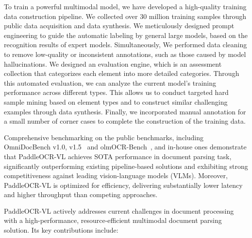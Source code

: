 \documentclass[11pt, a4paper,logo,  copyright, nonumbering]{paddleocr}
\begin{document}
To train a powerful multimodal model, we have developed a high-quality training data construction pipeline. We collected over 30 million training samples through public data acquisition and data synthesis. We meticulously designed prompt engineering to guide the automatic labeling by general large models, based on the recognition results of expert models. Simultaneously, We performed data cleaning to remove low-quality or inconsistent annotations, such as those caused by model hallucinations. We designed an evaluation engine, which is an assessment collection that categorizes each element into more detailed categories. Through this automated evaluation, we can analyze the current model's training performance across different types. This allows us to conduct targeted hard sample mining based on element types and to construct similar challenging examples through data synthesis. Finally, we incorporated manual annotation for a small number of corner cases to complete the construction of the training data.

Comprehensive benchmarking on the public benchmarks, including OmniDocBench v1.0, v1.5~\cite{ouyang2025omnidocbench} and olmOCR-Bench~\cite{poznanski2025olmocr}, and in-house ones
demonstrate that PaddleOCR-VL achieves SOTA performance in document parsing task, significantly outperforming existing pipeline-based solutions and exhibiting strong competitiveness against leading vision-language models (VLMs). Moreover, PaddleOCR-VL is optimized for efficiency, delivering substantially lower latency and higher throughput than competing approaches.

PaddleOCR-VL actively addresses current challenges in document processing with a high-performance, resource-efficient multimodal document parsing solution. Its key contributions include:
\end{document}
